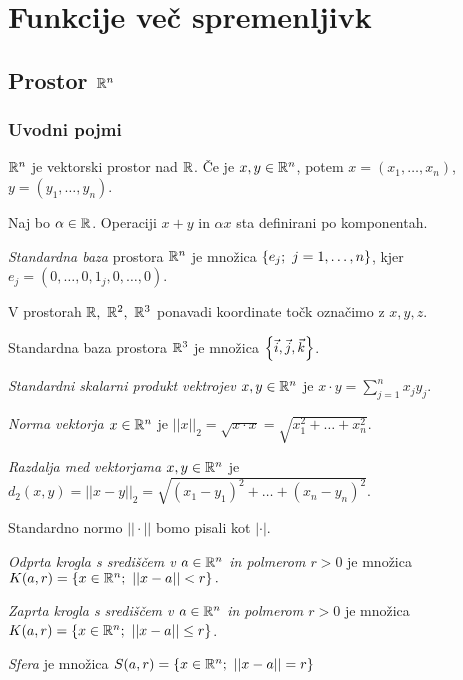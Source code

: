 \section{Funkcije več spremenljivk}
\subsection{Prostor $\mathbb{R}^n$}
\subsubsection{Uvodni pojmi}
$\mathbb{R}^n$ je vektorski prostor nad $\mathbb{R}$. 
Če je $x, y \in \mathbb{R}^n$, potem $x = (x_1, \ldots, x_n)$, $y = (y_1, \ldots, y_n)$. 

Naj bo $\alpha \in \mathbb{R}$. Operaciji $x+y$ in $\alpha x$ sta definirani po komponentah.

\begin{definicija}
    \emph{Standardna baza} prostora $\mathbb{R}^n$ je množica $\left\{e_j; \ j = 1, \ldots, n\right\}$, kjer $\displaystyle e_j = (0, \ldots, 0, 1_j , 0, \ldots, 0)$.
\end{definicija}

\begin{opomba}
    V prostorah $\mathbb{R}, \ \mathbb{R}^2, \ \mathbb{R}^3$ ponavadi koordinate točk označimo z $x, y, z$.
\end{opomba}

\begin{definicija}
    Standardna baza prostora $\mathbb{R}^3$ je množica $\left\{\vec{i}, \vec{j}, \vec{k}\right\}$.
\end{definicija}

\begin{definicija}
    \emph{Standardni skalarni produkt vektrojev $x, y \in \mathbb{R}^n$} je $x \cdot y = \sum_{j=1}^{n} x_jy_j$.

    \emph{Norma vektorja $x \in \mathbb{R}^n$} je  $||x||_2= \sqrt{x \cdot x} = \sqrt{x_1^2+\ldots+x_n^2}$.

    \emph{Razdalja med vektorjama $x, y \in \mathbb{R}^n$} je $d_2(x,y) = ||x-y||_2 = \sqrt{(x_1-y_1)^2 + \ldots + (x_n - y_n)^2}$.
\end{definicija}

\begin{opomba}
    Standardno normo $|| \cdot ||$ bomo pisali kot $| \cdot |$.
\end{opomba}

\begin{definicija}
    \emph{Odprta krogla s središčem v $a \in \mathbb{R}^n$ in polmerom $r>0$} je množica $K(a, r) = \set{x \in \RR^n; \ ||x-a||<r}.$

    \emph{Zaprta krogla s središčem v $a \in \mathbb{R}^n$ in polmerom $r>0$} je množica $K(a, r) = \set{x \in \RR^n; \ ||x-a|| \leq r}$.

    \emph{Sfera} je množica $S(a,r) = \left\{x \in \mathbb{R}^n; \ ||x-a|| = r\right\}$
\end{definicija}

